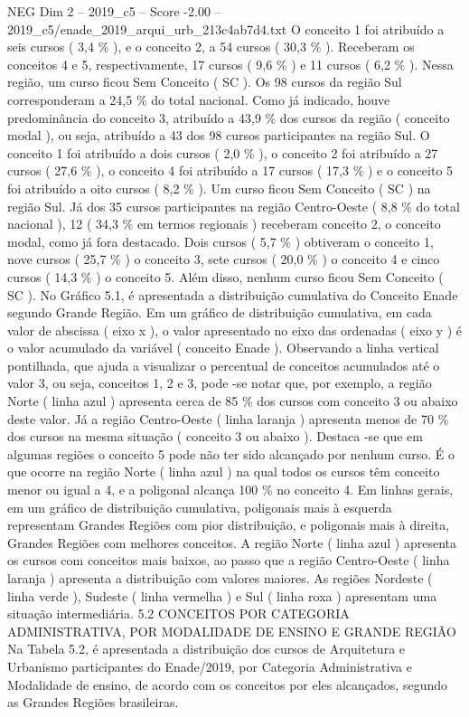 \begin{textsample}{NEG Dim 2 – 2019\_c5 – Score -2.00 – 2019\_c5/enade\_2019\_arqui\_urb\_213c4ab7d4.txt}
O conceito 1 foi atribuído a seis cursos ( 3,4 \% ), e o conceito 2, a 54 cursos ( 30,3 \% ).
Receberam os conceitos 4 e 5, respectivamente, 17 cursos ( 9,6 \% ) e 11 cursos ( 6,2 \% ).
Nessa região, um curso ficou Sem Conceito ( SC ).
Os 98 cursos da região Sul corresponderam a 24,5 \% do total nacional.
Como já indicado, houve predominância do conceito 3, atribuído a 43,9 \% dos cursos da região ( conceito modal ), ou seja, atribuído a 43 dos 98 cursos participantes na região Sul.
O conceito 1 foi atribuído a dois cursos ( 2,0 \% ), o conceito 2 foi atribuído a 27 cursos ( 27,6 \% ), o conceito 4 foi atribuído a 17 cursos ( 17,3 \% ) e o conceito 5 foi atribuído a oito cursos ( 8,2 \% ).
Um curso ficou Sem Conceito ( SC ) na região Sul.
Já dos 35 cursos participantes na região Centro-Oeste ( 8,8 \% do total nacional ), 12 ( 34,3 \% em termos regionais ) receberam conceito 2, o conceito modal, como já fora destacado.
Dois cursos ( 5,7 \% ) obtiveram o conceito 1, nove cursos ( 25,7 \% ) o conceito 3, sete cursos ( 20,0 \% ) o conceito 4 e cinco cursos ( 14,3 \% ) o conceito 5.
Além disso, nenhum curso ficou Sem Conceito ( SC ).
No Gráfico 5.1, é apresentada a distribuição cumulativa do Conceito Enade segundo Grande Região.
Em um gráfico de distribuição cumulativa, em cada valor de abscissa ( eixo x ), o valor apresentado no eixo das ordenadas ( eixo y ) é o valor acumulado da variável ( conceito Enade ).
Observando a linha vertical pontilhada, que ajuda a visualizar o percentual de conceitos acumulados até o valor 3, ou seja, conceitos 1, 2 e 3, pode -se notar que, por exemplo, a região Norte ( linha azul ) apresenta cerca de 85 \% dos cursos com conceito 3 ou abaixo deste valor.
Já a região Centro-Oeste ( linha laranja ) apresenta menos de 70 \% dos cursos na mesma situação ( conceito 3 ou abaixo ).
Destaca -se que em algumas regiões o conceito 5 pode não ter sido alcançado por nenhum curso.
É o que ocorre na região Norte ( linha azul ) na qual todos os cursos têm conceito menor ou igual a 4, e a poligonal alcança 100 \% no conceito 4.
Em linhas gerais, em um gráfico de distribuição cumulativa, poligonais mais à esquerda representam Grandes Regiões com pior distribuição, e poligonais mais à direita, Grandes Regiões com melhores conceitos.
A região Norte ( linha azul ) apresenta os cursos com conceitos mais baixos, ao passo que a região Centro-Oeste ( linha laranja ) apresenta a distribuição com valores maiores.
As regiões Nordeste ( linha verde ), Sudeste ( linha vermelha ) e Sul ( linha roxa ) apresentam uma situação intermediária. 5.2 CONCEITOS POR CATEGORIA ADMINISTRATIVA, POR MODALIDADE DE ENSINO E GRANDE REGIÃO Na Tabela 5.2, é apresentada a distribuição dos cursos de Arquitetura e Urbanismo participantes do Enade/2019, por Categoria Administrativa e Modalidade de ensino, de acordo com os conceitos por eles alcançados, segundo as Grandes Regiões brasileiras.

\end{textsample}
